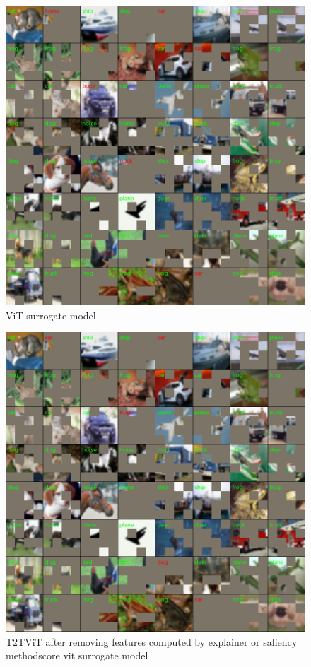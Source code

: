 \documentclass[magisterska,en]{pracamgr}
\begin{document}
\begin{figure}[H]
\centering
\includegraphics[scale=0.5]{./images/vit_surrogate_masks.png}
\caption{ViT surrogate model}
\label{vit_surrogate_masks}
\end{figure}


\begin{figure}[H]
\centering
\includegraphics[scale=0.5]{./images/t2t_vit_surrogate_masks.png}
\caption{T2T\textunderscore ViT after removing features computed by explainer or saliency methodscore vit surrogate model}
\label{t2t_vit_surrogate_masks}
\end{figure}
\end{document}
